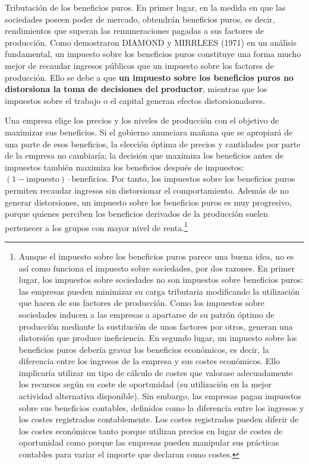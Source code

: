 \documentclass[10pt,a4paper]{article}
\begin{document}
Tributación de los beneficios puros. En primer lugar, en la medida en que las sociedades poseen poder de mercado, obtendrán beneficios puros, es decir, rendimientos que superan las remuneraciones pagadas a sus factores de producción. Como demostraron DIAMOND y MIRRLEES (1971) en un análisis fundamental, un impuesto sobre los beneficios puros constituye una forma mucho mejor de recaudar ingresos públicos que un impuesto sobre los factores de producción. Ello se debe a que \textbf{un impuesto sobre los beneficios puros no distorsiona la toma de decisiones del productor}, mientras que los impuestos sobre el trabajo o el capital generan efectos distorsionadores.

Una empresa elige los precios y los niveles de producción con el objetivo de maximizar sus beneficios. Si el gobierno anunciara mañana que se apropiará de una parte de esos beneficios, la elección óptima de precios y cantidades por parte de la empresa no cambiaría; la decisión que maximiza los beneficios antes de impuestos también maximiza los beneficios después de impuestos: $(1 − \text{impuesto}) \cdot \text{beneficios}$. Por tanto, los impuestos sobre los beneficios puros permiten recaudar ingresos sin distorsionar el comportamiento. Además de no generar distorsiones, un impuesto sobre los beneficios puros es muy progresivo, porque quienes perciben los beneficios derivados de la producción suelen pertenecer a los grupos con mayor nivel de renta.\footnote{%
    Aunque el impuesto sobre los beneficios puros parece una buena idea, no es así como funciona el impuesto sobre sociedades, por dos razones. En primer lugar, los impuestos sobre sociedades no son impuestos sobre beneficios puros: las empresas pueden minimizar su carga tributaria modificando la utilización que hacen de sus factores de producción. Como los impuestos sobre sociedades inducen a las empresas a apartarse de su patrón óptimo de producción mediante la sustitución de unos factores por otros, generan una distorsión que produce ineficiencia. En segundo lugar, un impuesto sobre los beneficios puros debería gravar los beneficios económicos, es decir, la diferencia entre los ingresos de la empresa y sus costes económicos. Ello implicaría utilizar un tipo de cálculo de costes que valorase adecuadamente los recursos según su coste de oportunidad (su utilización en la mejor actividad alternativa disponible). Sin embargo, las empresas pagan impuestos sobre sus beneficios contables, definidos como la diferencia entre los ingresos y los costes registrados contablemente. Los costes registrados pueden diferir de los costes económicos tanto porque utilizan precios en lugar de costes de oportunidad como porque las empresas pueden manipular sus prácticas contables para variar el importe que declaran como costes.
}
\end{document}
